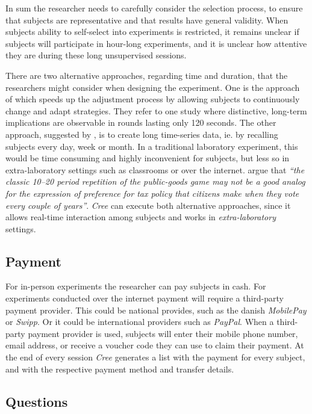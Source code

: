 \documentclass[preprint, 12pt]{elsarticle}
\newcommand{\Cree}{\emph{Cree}\xspace}
\begin{document}
In sum the researcher needs to carefully consider the selection process, to ensure that subjects are representative and that results have general validity. When subjects ability to self-select into experiments is restricted, it remains unclear if subjects will participate in hour-long experiments, and it is unclear how attentive they are during these long unsupervised sessions.

There are two alternative approaches, regarding time and duration, that the researchers might consider when designing the experiment. One is the approach of \citet*{Pettit_Friedman_Kephart_Oprea_2014} which speeds up the adjustment process by allowing subjects to continuously change and adapt strategies. They refer to one study where distinctive, long-term implications are observable in rounds lasting only 120 seconds. The other approach, suggested by \cite{Charness_Gneezy_Kuhn_2013}, is to create long time-series data, ie. by recalling subjects every day, week or month. In a traditional laboratory experiment, this would be time consuming and highly inconvenient for subjects, but less so in extra-laboratory settings such as classrooms or over the internet. \cite[p. 96]{Charness_Gneezy_Kuhn_2013} argue that \emph{``the classic 10–20 period repetition of the public-goods game may not be a good analog for the expression of preference for tax policy that citizens make when they vote every couple of years''}. \Cree can execute both alternative approaches, since it allows real-time interaction among subjects and works in \emph{extra-laboratory} settings.

\subsection{Payment}

For in-person experiments the researcher can pay subjects in cash. For experiments conducted over the internet payment will require a third-party payment provider. This could be national provides, such as the danish \emph{MobilePay} or \emph{Swipp}. Or it could be international providers such as \emph{PayPal}. When a third-party payment provider is used, subjects will enter their mobile phone number, email address, or receive a voucher code they can use to claim their payment. At the end of every session \Cree generates a list with the payment for every subject, and with the respective payment method and transfer details.

\subsection{Questions}
\end{document}
